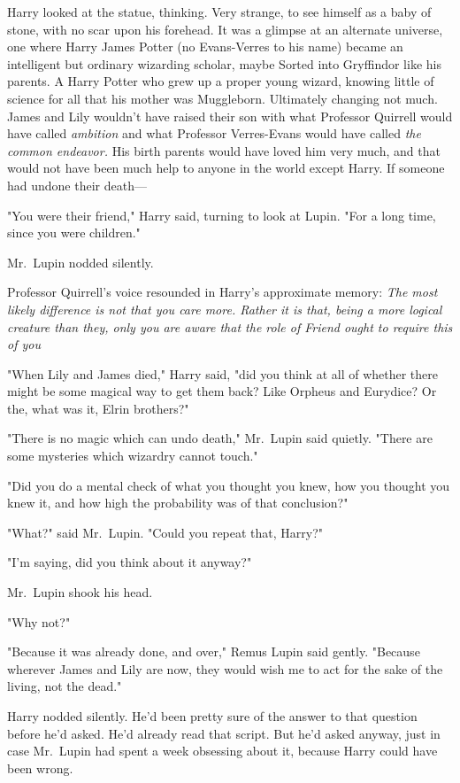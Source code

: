 Harry looked at the statue, thinking. Very strange, to see himself as a baby of
stone, with no scar upon his forehead. It was a glimpse at an alternate
universe, one where Harry James Potter (no Evans-Verres to his name) became an
intelligent but ordinary wizarding scholar, maybe Sorted into Gryffindor like
his parents. A Harry Potter who grew up a proper young wizard, knowing little
of science for all that his mother was Muggleborn. Ultimately changing{\el}
not much. James and Lily wouldn't have raised their son with what Professor
Quirrell would have called \emph{ambition} and what Professor Verres-Evans
would have called \emph{the common endeavor.} His birth parents would have
loved him very much, and that would not have been much help to anyone in the
world except Harry. If someone had undone their death---

"You were their friend," Harry said, turning to look at Lupin. "For a long
time, since you were children."

Mr.~Lupin nodded silently.

Professor Quirrell's voice resounded in Harry's approximate memory: \emph{The
most likely difference is not that you care more. Rather it is that, being a
more logical creature than they, only you are aware that the role of Friend
ought to require this of you{\el}}

"When Lily and James died," Harry said, "did you think at all of whether there
might be some magical way to get them back? Like Orpheus and Eurydice? Or the,
what was it, Elrin brothers?"

"There is no magic which can undo death," Mr.~Lupin said quietly. "There are
some mysteries which wizardry cannot touch."

"Did you do a mental check of what you thought you knew, how you thought you
knew it, and how high the probability was of that conclusion?"

"What?" said Mr.~Lupin. "Could you repeat that, Harry?"

"I'm saying, did you think about it anyway?"

Mr.~Lupin shook his head.

"Why not?"

"Because it was already done, and over," Remus Lupin said gently. "Because
wherever James and Lily are now, they would wish me to act for the sake of the
living, not the dead."

Harry nodded silently. He'd been pretty sure of the answer to that question
before he'd asked. He'd already read that script. But he'd asked anyway, just
in case Mr.~Lupin had spent a week obsessing about it, because Harry could have
been wrong.


